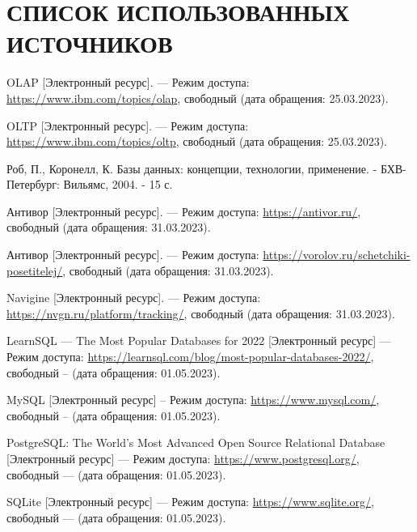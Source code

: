 \section*{СПИСОК ИСПОЛЬЗОВАННЫХ ИСТОЧНИКОВ}
\begingroup
\renewcommand{\section}[2]{}
\begin{thebibliography}{}

    OLAP [Электронный ресурс]. --- Режим доступа:
    \url{https://www.ibm.com/topics/olap}, свободный (дата обращения:
    25.03.2023).

    OLTP [Электронный ресурс]. --- Режим доступа:
    \url{https://www.ibm.com/topics/oltp}, свободный (дата обращения:
    25.03.2023).

    Роб, П., Коронелл, К. Базы данных: концепции, технологии, применение. -
    БХВ-Петербург: Вильямс, 2004. - 15 с.

    Антивор [Электронный ресурс]. --- Режим доступа: \url{https://antivor.ru/},
    свободный (дата обращения: 31.03.2023).

    Антивор [Электронный ресурс]. --- Режим доступа:
    \url{https://vorolov.ru/schetchiki-posetitelej/}, свободный (дата
    обращения:
    31.03.2023).

    Navigine [Электронный ресурс]. --- Режим доступа:
    \url{https://nvgn.ru/platform/tracking/}, свободный (дата обращения:
    31.03.2023).

    LearnSQL --- The Most Popular Databases for 2022 [Электронный ресурс]
    --- Режим доступа:
    \url{https://learnsql.com/blog/most-popular-databases-2022/}, свободный --
    (дата обращения: 01.05.2023).

    MySQL [Электронный ресурс] -- Режим доступа: \url{https://www.mysql.com/},
    свободный -- (дата обращения: 01.05.2023).

    PostgreSQL: The World's Most Advanced Open Source Relational Database
        [Электронный ресурс] --- Режим доступа:
    \url{https://www.postgresql.org/},
    свободный --- (дата обращения: 01.05.2023).

    SQLite [Электронный ресурс] --- Режим доступа:
    \url{https://www.sqlite.org/}, свободный --- (дата обращения: 01.05.2023).


\end{thebibliography}
